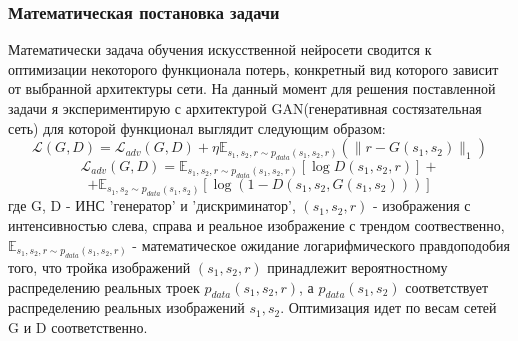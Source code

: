 \documentclass[9pt]{beamer}
\begin{document}
\begin{frame}
\begin{figure}
\begin{minipage}{0.47\linewidth}
		\end{minipage}
		\hfill
		\begin{minipage}{0.47\linewidth}
		\end{minipage}
	\end{figure}
\end{frame}

\begin{frame}\frametitle{Математическая постановка задачи}
	Математически задача обучения искусственной нейросети сводится к оптимизации некоторого функционала потерь, конкретный вид которого зависит от выбранной архитектуры сети. На данный момент для решения поставленной задачи я экспериментирую с архитектурой GAN(генеративная состязательная сеть) для которой функционал выглядит следующим образом:
	$$ \mathcal{L}(G, D) = \mathcal{L}_{adv}(G, D) + \eta \mathbb{E}_{s_1, s_2, r \sim p_{data}(s_1, s_2, r)} (\parallel r - G(s_1, s_2) \parallel_1)$$
	$$ \mathcal{L}_{adv}(G, D) = \mathbb{E}_{s_1, s_2, r \sim p_{data}(s_1, s_2, r)}[\log D(s_1, s_2, r)] + $$ $$ + \mathbb{E}_{s_1, s_2 \sim p_{data}(s_1, s_2)} [\log (1 - D(s_1, s_2, G(s_1, s_2)))]$$
	где G, D - ИНС 'генератор' и 'дискриминатор', $(s_1, s_2, r)$ - изображения с интенсивностью слева, справа и реальное изображение с трендом соотвественно,  $\mathbb{E}_{s_1, s_2, r \sim p_{data}(s_1, s_2, r)}$ - математическое ожидание логарифмического правдоподобия того, что тройка изображений $(s_1, s_2, r)$ принадлежит вероятностному распределению реальных троек $p_{data}(s_1, s_2, r)$, а $p_{data}(s_1, s_2)$ соответствует распределению реальных изображений $s_1, s_2$. Оптимизация идет по весам сетей G и D соответственно.
\end{frame}
\end{document}

